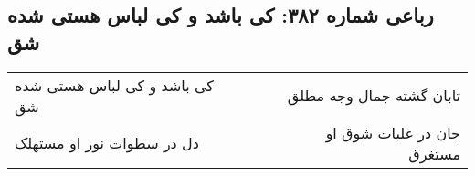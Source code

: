\begin{center}
\section*{رباعی شماره ۳۸۲: کی باشد و کی لباس هستی شده شق}
\label{sec:sh382}
\begin{longtable}{l p{0.5cm} r}
کی باشد و کی لباس هستی شده شق
&&
تابان گشته جمال وجه مطلق
\\
دل در سطوات نور او مستهلک
&&
جان در غلبات شوق او مستغرق
\\
\end{longtable}
\end{center}
